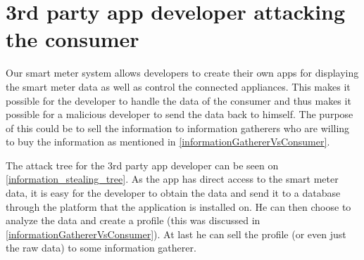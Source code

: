 \section{3rd party app developer attacking the consumer}\label{3rdpartyattacktree}
Our smart meter system allows developers to create their own apps for displaying the smart meter data as well as control the connected appliances.
This makes it possible for the developer to handle the data of the consumer and thus makes it possible for a malicious developer to send the data back to himself.
The purpose of this could be to sell the information to information gatherers who are willing to buy the information as mentioned in \cref{informationGathererVsConsumer}.

The attack tree for the 3rd party app developer can be seen on \cref{information_stealing_tree}.
As the app has direct access to the smart meter data, it is easy for the developer to obtain the data and send it to a database through the platform that the application is installed on.
He can then choose to analyze the data and create a profile (this was discussed in \cref{informationGathererVsConsumer}).
At last he can sell the profile (or even just the raw data) to some information gatherer.


